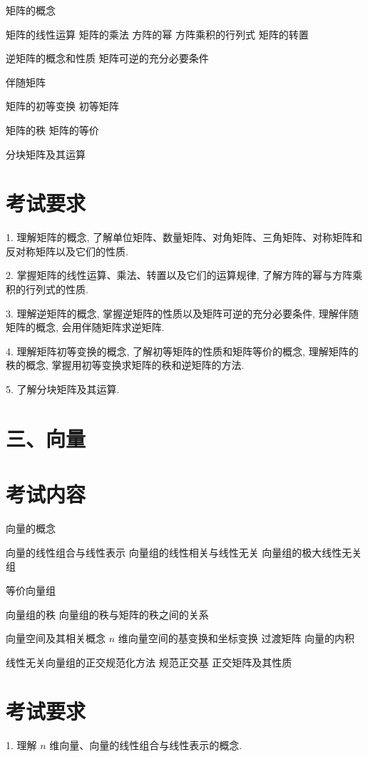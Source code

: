 \documentclass[10pt]{article}
\begin{document}
矩阵的概念 

矩阵的线性运算 矩阵的乘法 方阵的幂 方阵乘积的行列式 矩阵的转置 

逆矩阵的概念和性质 矩阵可逆的充分必要条件 

伴随矩阵 

矩阵的初等变换 初等矩阵 

矩阵的秩 矩阵的等价 

分块矩阵及其运算

\section*{考试要求}

1. 理解矩阵的概念, 了解单位矩阵、数量矩阵、对角矩阵、三角矩阵、对称矩阵和反对称矩阵以及它们的性质.

2. 掌握矩阵的线性运算、乘法、转置以及它们的运算规律, 了解方阵的幂与方阵乘积的行列式的性质.

3. 理解逆矩阵的概念, 掌握逆矩阵的性质以及矩阵可逆的充分必要条件, 理解伴随矩阵的概念, 会用伴随矩阵求逆矩阵.

4. 理解矩阵初等变换的概念, 了解初等矩阵的性质和矩阵等价的概念, 理解矩阵的秩的概念, 掌握用初等变换求矩阵的秩和逆矩阵的方法.

5. 了解分块矩阵及其运算.

\section*{三、向量}

\section*{考试内容}

向量的概念 

向量的线性组合与线性表示 向量组的线性相关与线性无关 向量组的极大线性无关组 

等价向量组 

向量组的秩 向量组的秩与矩阵的秩之间的关系 

向量空间及其相关概念 \(n\) 维向量空间的基变换和坐标变换 过渡矩阵 向量的内积 

线性无关向量组的正交规范化方法 规范正交基 正交矩阵及其性质

\section*{考试要求}

1. 理解 \(n\) 维向量、向量的线性组合与线性表示的概念.
\end{document}
